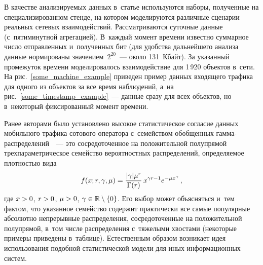 \begin{multicols}{2}
\vspace*{-2pt}

В качестве анализируемых данных в~\mbox{статье} используются наборы, полученные на 
специализированном стен\-де,
на котором моделируются раз\-лич\-ные сценарии реальных сетевых взаимодействий. 
Рас\-смат\-ри\-ва\-ют\-ся суточные данные (с~пятиминутной агрегацией). В~каж\-дый момент 
времени известно суммарное чис\-ло отправленных и~полученных бит (для удобства 
дальнейшего анализа данные нормированы значением~$2^{20}$~--- около 131~Кбайт). 
За указанный промежуток времени моделировалось взаимодействие для 1\,920  
объектов в~сети.
На рис.~\ref{some_machine_example} приведен пример данных входящего трафика для 
одного из объектов за все время наблюдений, а~на 
рис.~\ref{some_timestamp_example}~--- данные сразу для всех объектов, но в~некоторый фиксированный момент вре\-мени. 

Ранее авторами было установлено высокое ста\-ти\-сти\-че\-ское согласие данных 
мобильного трафика сотового оператора с~семейством обоб\-щен\-ных 
гам\-ма-рас\-пре\-де\-ле\-ний~\cite{Stacy1962}~--- это со\-сре\-до\-то\-чен\-ное на положительной 
полупрямой трех\-па\-ра\-мет\-ри\-че\-ское семейство вероятностных распределений, 
опре\-де\-ля\-емое плот\-ностью вида
$$f(x;r,\gamma,\mu)\hm=\fr{|\gamma|\mu^r}{\Gamma(r)}\,x^{\gamma r - 1} e^{-\mu x^{\gamma}}\,,$$ 
где $x\hm>0$, $r\hm>0$, $\mu\hm > 0$, $\gamma\hm\in\mathbb{R}\setminus\{0\}$.
Его выбор может объясняться и~тем фактом, что указанное семейство содержит 
практически все самые популярные абсолютно непрерывные рас\-пре\-де\-ле\-ния, 
со\-сре\-до\-то\-чен\-ные на положительной полупрямой, в~том чис\-ле рас\-пре\-де\-ле\-ния 
с~тяжелыми хвос\-та\-ми (некоторые примеры приведены в~таб\-ли\-це). %
Естественным образом возникает идея использования по\-доб\-ной ста\-ти\-сти\-че\-ской модели 
для иных информационных сис\-тем.


\end{multicols}
